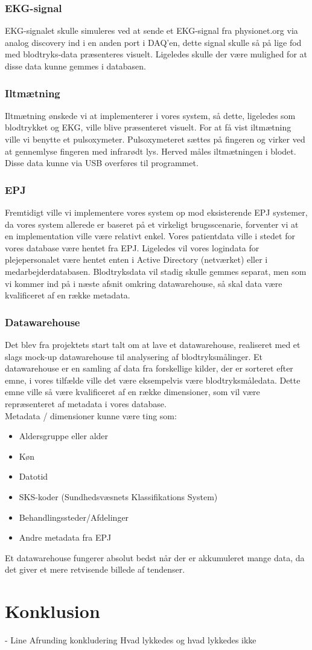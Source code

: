\subsection{EKG-signal}
EKG-signalet skulle  simuleres ved at sende et EKG-signal fra physionet.org via analog discovery ind i en anden port i DAQ’en, dette signal skulle så på lige fod med blodtryks-data præsenteres visuelt. Ligeledes skulle der være mulighed for at disse data kunne gemmes i databasen.
\subsection{Iltmætning}
Iltmætning ønskede vi at implementerer i vores system, så dette, ligeledes som blodtrykket og EKG, ville blive præsenteret visuelt. For at få vist iltmætning ville vi benytte et pulsoxymeter. Pulsoxymeteret sættes på fingeren og virker ved at gennemlyse fingeren med infrarødt lys. Herved måles iltmætningen i blodet. Disse data kunne via USB overføres til programmet. 
\subsection{EPJ}
Fremtidigt ville vi implementere vores system op mod eksisterende EPJ systemer, da vores system allerede er baseret på et virkeligt brugsscenarie, forventer vi at en implementation ville være relativt enkel. Vores patientdata ville i stedet for vores database være hentet fra EPJ.  Ligeledes vil vores logindata for plejepersonalet være hentet enten i Active Directory (netværket) eller i medarbejderdatabasen. Blodtryksdata vil stadig skulle gemmes separat, men som vi kommer ind på i næste afsnit omkring datawarehouse, så skal data være kvalificeret af en række metadata.
\subsection{Datawarehouse}
Det blev fra projektets start talt om at lave et datawarehouse, realiseret med et slags mock-up datawarehouse til analysering af blodtryksmålinger. Et datawarehouse er en samling af data fra forskellige kilder, der er sorteret efter emne, i vores tilfælde ville det være eksempelvis være blodtryksmåledata. Dette emne ville så være kvalificeret af en række dimensioner, som vil være repræsenteret af metadata i vores database.\\ 
Metadata / dimensioner kunne være ting som:
\begin{itemize}
\item Aldersgruppe eller alder
\item Køn
\item Datotid
\item SKS-koder (Sundhedsvæsnets Klassifikations System)
\item Behandlingssteder/Afdelinger
\item Andre metadata fra EPJ
\end{itemize}
Et datawarehouse fungerer absolut bedst når der er akkumuleret mange data, da det giver et mere retvisende billede af tendenser. 
\chapter{Konklusion}
- Line
Afrunding
konkludering
Hvad lykkedes og hvad lykkedes ikke